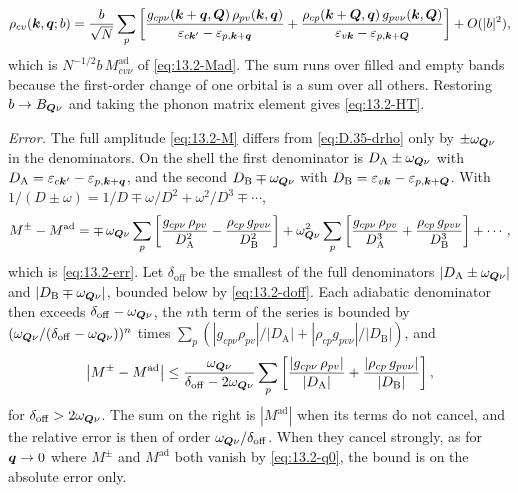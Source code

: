 \begin{equation}
  \rho_{cv}(\bm{k},\bm{q};b) = \frac{b}{\sqrt N}\sum_p\left[\frac{g_{cp\nu}(\bm{k}+\bm{q},\bm{Q})\,\rho_{pv}(\bm{k},\bm{q})}{\varepsilon_{c\bm{k}'} - \varepsilon_{p,\bm{k}+\bm{q}}} + \frac{\rho_{cp}(\bm{k}+\bm{Q},\bm{q})\,g_{pv\nu}(\bm{k},\bm{Q})}{\varepsilon_{v\bm{k}} - \varepsilon_{p,\bm{k}+\bm{Q}}}\right] + O(|b|^2) ,
  \label{eq:D.35-drho}
\end{equation}
which is $N^{-1/2}b\,M^{\mathrm{ad}}_{cv\nu}$ of \cref{eq:13.2-Mad}. The sum runs over filled and empty bands because the first-order change of one orbital is a sum over all others. Restoring $b \to B_{\bm{Q}\nu}$ and taking the phonon matrix element gives \cref{eq:13.2-HT}.

\emph{Error.} The full amplitude \cref{eq:13.2-M} differs from \cref{eq:D.35-drho} only by $\pm\omega_{\bm{Q}\nu}$ in the denominators. On the shell the first denominator is $D_{\mathrm{A}} \pm \omega_{\bm{Q}\nu}$ with $D_{\mathrm{A}} = \varepsilon_{c\bm{k}'} - \varepsilon_{p,\bm{k}+\bm{q}}$, and the second $D_{\mathrm{B}} \mp \omega_{\bm{Q}\nu}$ with $D_{\mathrm{B}} = \varepsilon_{v\bm{k}} - \varepsilon_{p,\bm{k}+\bm{Q}}$. With $1/(D \pm \omega) = 1/D \mp \omega/D^2 + \omega^2/D^3 \mp \cdots$,
\begin{equation*}
  M^\pm - M^{\mathrm{ad}} = \mp\,\omega_{\bm{Q}\nu}\sum_p\left[\frac{g_{cp\nu}\,\rho_{pv}}{D_{\mathrm{A}}^2} - \frac{\rho_{cp}\,g_{pv\nu}}{D_{\mathrm{B}}^2}\right] + \omega_{\bm{Q}\nu}^2\sum_p\left[\frac{g_{cp\nu}\,\rho_{pv}}{D_{\mathrm{A}}^3} + \frac{\rho_{cp}\,g_{pv\nu}}{D_{\mathrm{B}}^3}\right] + \cdots ,
\end{equation*}
which is \cref{eq:13.2-err}. Let $\delta_{\mathrm{off}}$ be the smallest of the full denominators $|D_{\mathrm{A}} \pm \omega_{\bm{Q}\nu}|$ and $|D_{\mathrm{B}} \mp \omega_{\bm{Q}\nu}|$, bounded below by \cref{eq:13.2-doff}. Each adiabatic denominator then exceeds $\delta_{\mathrm{off}} - \omega_{\bm{Q}\nu}$, the $n$th term of the series is bounded by $(\omega_{\bm{Q}\nu}/(\delta_{\mathrm{off}} - \omega_{\bm{Q}\nu}))^n$ times $\sum_p(|g_{cp\nu}\rho_{pv}|/|D_{\mathrm{A}}| + |\rho_{cp}g_{pv\nu}|/|D_{\mathrm{B}}|)$, and
\begin{equation*}
  \bigl|M^\pm - M^{\mathrm{ad}}\bigr| \le \frac{\omega_{\bm{Q}\nu}}{\delta_{\mathrm{off}} - 2\omega_{\bm{Q}\nu}}\sum_p\left[\frac{|g_{cp\nu}\,\rho_{pv}|}{|D_{\mathrm{A}}|} + \frac{|\rho_{cp}\,g_{pv\nu}|}{|D_{\mathrm{B}}|}\right] ,
\end{equation*}
for $\delta_{\mathrm{off}} > 2\omega_{\bm{Q}\nu}$. The sum on the right is $|M^{\mathrm{ad}}|$ when its terms do not cancel, and the relative error is then of order $\omega_{\bm{Q}\nu}/\delta_{\mathrm{off}}$. When they cancel strongly, as for $\bm{q}\to0$ where $M^\pm$ and $M^{\mathrm{ad}}$ both vanish by \cref{eq:13.2-q0}, the bound is on the absolute error only.

